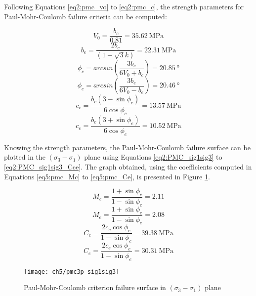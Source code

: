 Following Equations \ref{eq2:pmc_vo} to \ref{eq2:pmc_c}, the strength parameters for Paul-Mohr-Coulomb failure criteria can be computed:

\begin{equation}
    V_0 = \frac{b_c}{0.81} = \SI{35.62}{\mega\pascal}
\end{equation}
\begin{equation}\label{eq5:pmc_be}
    b_e = \frac{2b_c}{(1-\sqrt{3}k)} = \SI{22.31}{\mega\pascal}
\end{equation}
\begin{equation}
    \phi_c = arcsin\left(\frac{3b_c}{6V_0+b_c}\right) = \SI{20.85}{\degree}
\end{equation}
\begin{equation}
    \phi_e = arcsin\left(\frac{3b_e}{6V_0-b_e}\right) = \SI{20.46}{\degree}
\end{equation}
\begin{equation}
    c_{c}=\frac{b_{c}\left(3-\sin \phi_{c}\right)}{6 \cos \phi_{c}} = \SI{13.57}{\mega\pascal}
\end{equation}
\begin{equation}
    c_{e}=\frac{b_{e}\left(3+\sin \phi_{e}\right)}{6 \cos \phi_{e}} = \SI{10.52}{\mega\pascal}
\end{equation}

Knowing the strength parameters, the Paul-Mohr-Coulomb failure surface can be plotted in the $(\sigma_3-\sigma_1)$ plane using Equations \ref{eq2:PMC_sig1sig3} to \ref{eq2:PMC_sig1sig3_Cce}. The graph obtained, using the coefficients computed in Equations \ref{eq5:pmc_Mc} to \ref{eq5:pmc_Ce}, is presented in Figure \ref{fig5:pmc_sig1sig3}.

\begin{equation}\label{eq5:pmc_Mc}
    M_c = \frac{1+\sin \phi_c}{1-\sin \phi_c} = 2.11
\end{equation}
\begin{equation}
    M_e = \frac{1+\sin \phi_e}{1-\sin \phi_e} = 2.08
\end{equation}
\begin{equation}
    C_c = \frac{2c_c\cos \phi_c}{1-\sin \phi_c} = \SI{39.38}{\mega\pascal}
\end{equation}
\begin{equation}\label{eq5:pmc_Ce}
    C_e = \frac{2c_e\cos \phi_e}{1-\sin \phi_e} = \SI{30.31}{\mega\pascal}
\end{equation}

\begin{figure}[p]
    \centering
    \texttt{[image: ch5/pmc3p\_sig1sig3]}
    \caption{Paul-Mohr-Coulomb criterion failure surface in  $(\sigma_3-\sigma_1)$ plane}
    \label{fig5:pmc_sig1sig3}
\end{figure}

